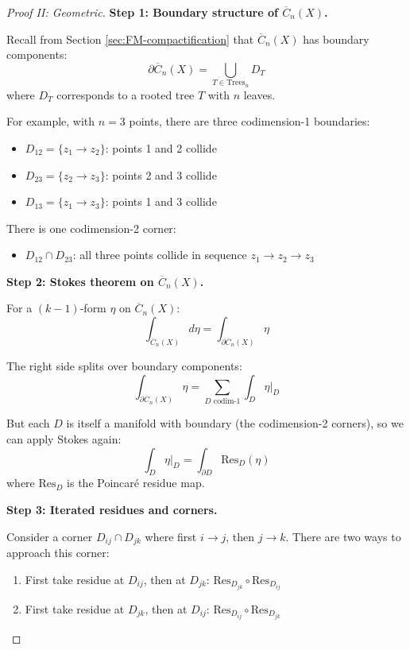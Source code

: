 \begin{proof}[Proof II: Geometric]

\textbf{Step 1: Boundary structure of $\overline{C}_n(X)$.}

Recall from Section \ref{sec:FM-compactification} that $\overline{C}_n(X)$ has boundary 
components:
\begin{equation}
\partial \overline{C}_n(X) = \bigcup_{T \in \text{Trees}_n} D_T
\end{equation}
where $D_T$ corresponds to a rooted tree $T$ with $n$ leaves.

For example, with $n=3$ points, there are three codimension-1 boundaries:
\begin{itemize}
\item $D_{12} = \{z_1 \to z_2\}$: points 1 and 2 collide
\item $D_{23} = \{z_2 \to z_3\}$: points 2 and 3 collide
\item $D_{13} = \{z_1 \to z_3\}$: points 1 and 3 collide
\end{itemize}

There is one codimension-2 corner:
\begin{itemize}
\item $D_{12} \cap D_{23}$: all three points collide in sequence $z_1 \to z_2 \to z_3$
\end{itemize}

\textbf{Step 2: Stokes theorem on $\overline{C}_n(X)$.}

For a $(k-1)$-form $\eta$ on $\overline{C}_n(X)$:
\begin{equation}
\int_{\overline{C}_n(X)} d\eta = \int_{\partial \overline{C}_n(X)} \eta
\end{equation}

The right side splits over boundary components:
\begin{equation}
\int_{\partial \overline{C}_n(X)} \eta = \sum_{D \text{ codim-1}} \int_D \eta|_D
\end{equation}

But each $D$ is itself a manifold with boundary (the codimension-2 corners), so we can 
apply Stokes again:
\begin{equation}
\int_D \eta|_D = \int_{\partial D} \text{Res}_D(\eta)
\end{equation}
where $\text{Res}_D$ is the Poincaré residue map.

\textbf{Step 3: Iterated residues and corners.}

Consider a corner $D_{ij} \cap D_{jk}$ where first $i \to j$, then $j \to k$. There are 
two ways to approach this corner:
\begin{enumerate}
\item First take residue at $D_{ij}$, then at $D_{jk}$: $\text{Res}_{D_{jk}} \circ 
\text{Res}_{D_{ij}}$
\item First take residue at $D_{jk}$, then at $D_{ij}$: $\text{Res}_{D_{ij}} \circ 
\text{Res}_{D_{jk}}$
\end{enumerate}


\end{proof}
